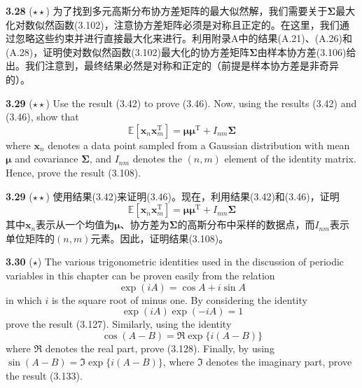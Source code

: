 \documentclass{article}
\begin{document}
\textbf{3.28} ($\star\star$) 为了找到多元高斯分布协方差矩阵的最大似然解，我们需要关于$\boldsymbol{\Sigma}$最大化对数似然函数(3.102)，注意协方差矩阵必须是对称且正定的。在这里，我们通过忽略这些约束并进行直接最大化来进行。利用附录A中的结果(A.21)、(A.26)和(A.28)，证明使对数似然函数(3.102)最大化的协方差矩阵$\boldsymbol{\Sigma}$由样本协方差(3.106)给出。我们注意到，最终结果必然是对称和正定的（前提是样本协方差是非奇异的）。

\textbf{3.29} ($\star\star$) Use the result (3.42) to prove (3.46). Now, using the results (3.42) and (3.46), show that
\begin{equation}
\mathbb{E}[\mathbf{x}_n \mathbf{x}_m^\mathrm{T}] = \boldsymbol{\mu}\boldsymbol{\mu}^\mathrm{T} + I_{nm}\boldsymbol{\Sigma} \tag{3.213}
\end{equation}
where $\mathbf{x}_n$ denotes a data point sampled from a Gaussian distribution with mean $\boldsymbol{\mu}$ and covariance $\boldsymbol{\Sigma}$, and $I_{nm}$ denotes the $(n, m)$ element of the identity matrix. Hence, prove the result (3.108).

\textbf{3.29} ($\star\star$) 使用结果(3.42)来证明(3.46)。现在，利用结果(3.42)和(3.46)，证明
\begin{equation}
\mathbb{E}[\mathbf{x}_n \mathbf{x}_m^\mathrm{T}] = \boldsymbol{\mu}\boldsymbol{\mu}^\mathrm{T} + I_{nm}\boldsymbol{\Sigma} \tag{3.213}
\end{equation}
其中$\mathbf{x}_n$表示从一个均值为$\boldsymbol{\mu}$、协方差为$\boldsymbol{\Sigma}$的高斯分布中采样的数据点，而$I_{nm}$表示单位矩阵的$(n, m)$元素。因此，证明结果(3.108)。

\textbf{3.30} ($\star$) The various trigonometric identities used in the discussion of periodic variables in this chapter can be proven easily from the relation
\begin{equation}
\exp(iA) = \cos A + i \sin A \tag{3.214}
\end{equation}
in which $i$ is the square root of minus one. By considering the identity
\begin{equation}
\exp(iA)\exp(-iA) = 1 \tag{3.215}
\end{equation}
prove the result (3.127). Similarly, using the identity
\begin{equation}
\cos(A-B) = \Re \exp\{i(A-B)\} \tag{3.216}
\end{equation}
where $\Re$ denotes the real part, prove (3.128). Finally, by using $\sin(A-B) = \Im \exp\{i(A-B)\}$, where $\Im$ denotes the imaginary part, prove the result (3.133).
\end{document}
